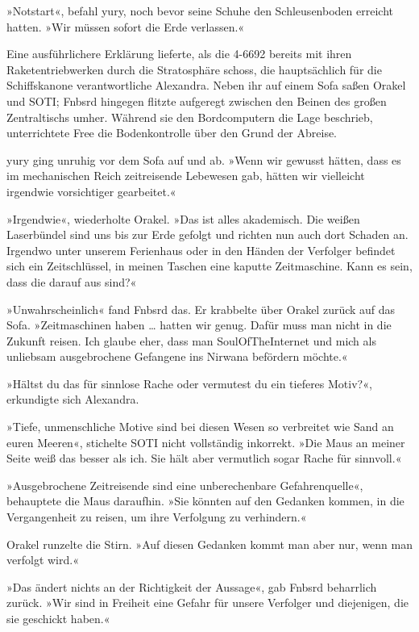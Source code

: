 »Notstart«, befahl yury, noch bevor seine Schuhe den Schleusenboden erreicht hatten. »Wir müssen sofort die Erde verlassen.«

Eine ausführlichere Erklärung lieferte, als die 4-6692 bereits mit ihren Raketentriebwerken durch die Stratosphäre schoss, die hauptsächlich für die Schiffskanone verantwortliche Alexandra. Neben ihr auf einem Sofa saßen Orakel und SOTI; Fnbsrd hingegen flitzte aufgeregt zwischen den Beinen des großen Zentraltischs umher. Während sie den Bordcomputern die Lage beschrieb, unterrichtete Free die Bodenkontrolle über den Grund der Abreise.

yury ging unruhig vor dem Sofa auf und ab. »Wenn wir gewusst hätten, dass es im mechanischen Reich zeitreisende Lebewesen gab, hätten wir vielleicht irgendwie vorsichtiger gearbeitet.«

»Irgendwie«, wiederholte Orakel. »Das ist alles akademisch. Die weißen Laserbündel sind uns bis zur Erde gefolgt und richten nun auch dort Schaden an. Irgendwo unter unserem Ferienhaus oder in den Händen der Verfolger befindet sich ein Zeitschlüssel, in meinen Taschen eine kaputte Zeitmaschine. Kann es sein, dass die darauf aus sind?«

»Unwahrscheinlich« fand Fnbsrd das. Er krabbelte über Orakel zurück auf das Sofa. »Zeitmaschinen haben … hatten wir genug. Dafür muss man nicht in die Zukunft reisen. Ich glaube eher, dass man SoulOfTheInternet und mich als unliebsam ausgebrochene Gefangene ins Nirwana befördern möchte.«

»Hältst du das für sinnlose Rache oder vermutest du ein tieferes Motiv?«, erkundigte sich Alexandra.

»Tiefe, unmenschliche Motive sind bei diesen Wesen so verbreitet wie Sand an euren Meeren«, stichelte SOTI nicht vollständig inkorrekt. »Die Maus an meiner Seite weiß das besser als ich. Sie hält aber vermutlich sogar Rache für sinnvoll.«

»Ausgebrochene Zeitreisende sind eine unberechenbare Gefahrenquelle«, behauptete die Maus daraufhin. »Sie könnten auf den Gedanken kommen, in die Vergangenheit zu reisen, um ihre Verfolgung zu verhindern.«

Orakel runzelte die Stirn. »Auf diesen Gedanken kommt man aber nur, wenn man verfolgt wird.«

»Das ändert nichts an der Richtigkeit der Aussage«, gab Fnbsrd beharrlich zurück. »Wir sind in Freiheit eine Gefahr für unsere Verfolger und diejenigen, die sie geschickt haben.«

